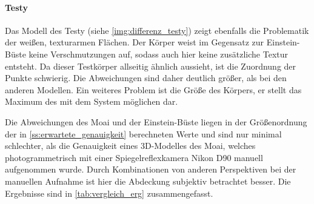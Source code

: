\documentclass[./00PhotoBox.tex]{subfiles}
\begin{document}
\paragraph{Testy}
Das Modell des Testy (siehe \autoref{img:differenz_testy}) zeigt ebenfalls die Problematik der weißen, texturarmen Flächen. Der Körper weist im Gegensatz zur Einstein-Büste keine Verschmutzungen auf, sodass auch hier keine zusätzliche Textur entsteht. Da dieser Testkörper allseitig ähnlich aussieht, ist die Zuordnung der Punkte schwierig. Die Abweichungen sind daher deutlich größer, als bei den anderen Modellen. Ein weiteres Problem ist die Größe des Körpers, er stellt das Maximum des mit dem System möglichen dar.

Die Abweichungen des Moai und der Einstein-Büste liegen in der Größenordnung der in \autoref{ss:erwartete_genauigkeit} berechneten Werte und sind nur minimal schlechter, als die Genauigkeit eines 3D-Modelles des Moai, welches photogrammetrisch mit einer Spiegelreflexkamera Nikon D90 manuell aufgenommen wurde. Durch Kombinationen von anderen Perspektiven bei der manuellen Aufnahme ist hier die Abdeckung subjektiv betrachtet besser. Die Ergebnisse sind in \autoref{tab:vergleich_erg} zusammengefasst.
\end{document}
